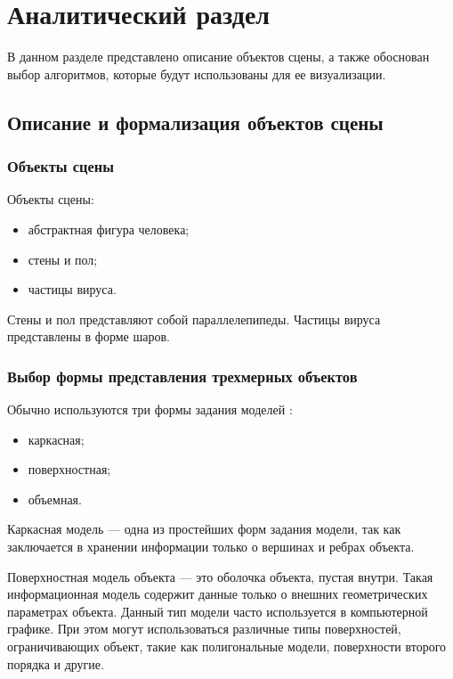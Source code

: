 \chapter{Аналитический раздел}
\label{cha:analysis}


В данном разделе представлено описание объектов сцены, а также обоснован выбор алгоритмов, которые будут использованы для ее визуализации.

\section{Описание и формализация объектов сцены}

\subsection{Объекты сцены}
Объекты сцены:
\begin{itemize}
	\item абстрактная фигура человека;
	\item стены и пол;
	\item частицы вируса.
\end{itemize}

Стены и пол представляют собой параллелепипеды. Частицы вируса представлены в форме шаров.

\subsection{Выбор формы представления трехмерных объектов}

Обычно используются три формы задания моделей \cite{kurov}:
\begin{itemize}
	\item каркасная;
	\item поверхностная;
	\item объемная.
\end{itemize}

Каркасная модель --- одна из простейших форм задания модели, так как заключается в хранении информации только о вершинах и ребрах объекта. 

Поверхностная модель объекта --- это оболочка объекта, пустая внутри. Такая информационная модель содержит данные только о внешних геометрических параметрах объекта. Данный тип модели часто используется в компьютерной графике. При этом могут использоваться различные типы поверхностей, ограничивающих объект, такие как полигональные модели, поверхности второго порядка и другие.

